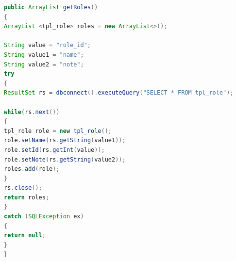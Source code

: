 \newpage


\begin{lstlisting}[language=JAVA, caption=Datenbankanbindung.java/Methode-getRoles, firstnumber=59]
public ArrayList getRoles()
{
ArrayList <tpl_role> roles = new ArrayList<>();

String value = "role_id";
String value1 = "name";
String value2 = "note";
try 
{
ResultSet rs = dbconnect().executeQuery("SELECT * FROM tpl_role");

while(rs.next())
{
tpl_role role = new tpl_role();
role.setName(rs.getString(value1));
role.setId(rs.getInt(value));
role.setNote(rs.getString(value2));
roles.add(role);
}
rs.close();
return roles;
} 
catch (SQLException ex) 
{
return null;
}
}
\end{lstlisting}

\newpage


